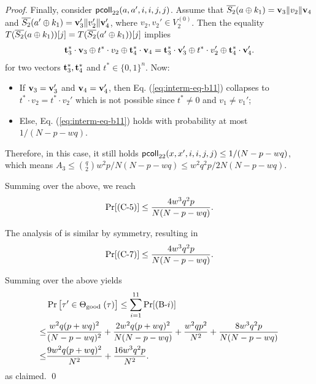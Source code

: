 \begin{proof}
Finally, consider $\mathsf{pcoll}_{22}(a,a',i,i,j,j)$. Assume that $\overline{S_2}(a\oplus k_1)=\mathbf{v}_3\|v_2\|\mathbf{v}_4$ and
$\overline{S_2}(a'\oplus k_1)=\mathbf{v}_3'\|v_2'\|\mathbf{v}_4'$, where $v_2,v_2'\in V_2^{(0)}$. Then the equality $T(\overline{S_2}(a\oplus k_1))[j]=T(\overline{S_2}(a'\oplus k_1))[j]$ implies
%
\begin{align}
\mathbf{t}_3^*\cdot\mathbf{v}_3\oplus t^*\cdot v_2\oplus\mathbf{t}_4^*\cdot\mathbf{v}_4=\mathbf{t}_3^*\cdot\mathbf{v}_3'\oplus t^*\cdot v_2'\oplus\mathbf{t}_4^*\cdot\mathbf{v}_4'.
\label{eq:interm-eq-b11}
\end{align}
%
%
for two vectors $\mathbf{t}_3^*,\mathbf{t}_4^*$ and $t^*\in\{0,1\}^n$. Now:
\begin{itemize}
	\item If $\mathbf{v}_3=\mathbf{v}_3'$ and $\mathbf{v}_4=\mathbf{v}_4'$, then Eq. (\ref{eq:interm-eq-b11}) collapses to $t^*\cdot v_2=t^*\cdot v_2'$ which is not possible since $t^*\neq 0$ and $v_1\neq v_1'$;
	\item Else, Eq. (\ref{eq:interm-eq-b11}) holds with probability at most $1/(N-p-wq)$.
\end{itemize}
Therefore, in this case, it still holds $\mathsf{pcoll}_{22}(x,x',i,i,j,j)\leq1/(N-p-wq)$, which means $A_3\leq{q\choose2}w^2p/N(N-p-wq)\leq w^2q^2p/2N(N-p-wq)$.



Summing over the above, we reach
%
$$\Pr[\text{(C-5)}]\leq\frac{4w^3q^2p}{N(N-p-wq)}.$$
%

The analysis of \cseven is similar by symmetry, resulting in
%
%
$$\Pr[\text{(C-7)}]\leq\frac{4w^3q^2p}{N(N-p-wq)}.$$
%



\arrangespace


Summing over the above yields
%
\begin{align*}
&  \Pr\big[ \tau' \in \Theta_{\text {good }}(\tau)\big]  \leq \sum_{i=1}^{11}\Pr[\text{(B-}i)]       \\
\leq  & \frac{w^2 q (p+w q)^{2}}{(N-p-wq)^{2}}+
\frac{2w^2 q (p+w q)^{2}}{N  (N-p-wq)}+
\frac{w^2qp^2}{N^2}+
\frac{8w^3q^2p}{N(N-p-wq)}      \\
\leq  & \frac{9w^2 q (p+w q)^{2}}{N^2}+ \frac{16w^3q^2p}{N^2} .
\end{align*}
%
as claimed.        \qed
\end{proof}











